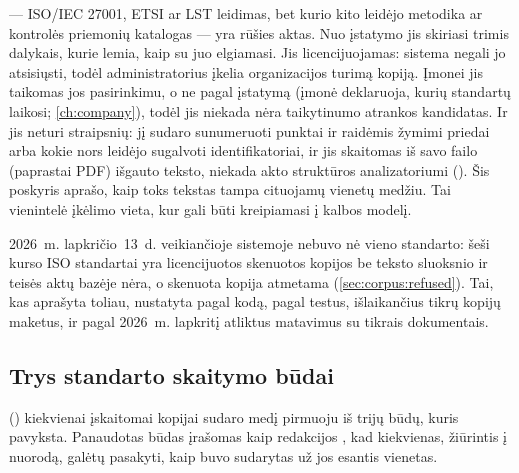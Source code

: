  --- ISO/IEC 27001, ETSI ar LST leidimas, bet kurio kito leidėjo metodika ar
kontrolės priemonių katalogas --- yra  rūšies aktas. Nuo įstatymo jis skiriasi
trimis dalykais, kurie lemia, kaip su juo elgiamasi. Jis licencijuojamas: sistema negali jo
atsisiųsti, todėl administratorius įkelia organizacijos turimą kopiją. Įmonei jis taikomas jos
pasirinkimu, o ne pagal įstatymą (įmonė deklaruoja, kurių standartų laikosi;
\cref{ch:company}), todėl jis niekada nėra taikytinumo atrankos kandidatas. Ir jis neturi
straipsnių: jį sudaro sunumeruoti punktai ir raidėmis žymimi priedai arba kokie nors leidėjo
sugalvoti identifikatoriai, ir jis skaitomas iš savo failo (paprastai PDF) išgauto teksto,
niekada akto struktūros analizatoriumi (). Šis poskyris aprašo, kaip toks
tekstas tampa cituojamų vienetų medžiu. Tai vienintelė įkėlimo vieta, kur gali būti kreipiamasi
į kalbos modelį.

2026~m. lapkričio~13~d. veikiančioje sistemoje nebuvo nė vieno standarto: šeši kurso ISO
standartai yra licencijuotos skenuotos kopijos be teksto sluoksnio ir teisės aktų bazėje
nėra, o skenuota kopija atmetama (\cref{sec:corpus:refused}). Tai, kas aprašyta toliau,
nustatyta pagal kodą, pagal testus, išlaikančius tikrų kopijų maketus, ir pagal 2026~m.
lapkritį atliktus matavimus su tikrais dokumentais.

\subsection{Trys standarto skaitymo būdai}\label{sec:corpus:ways}

 () kiekvienai įskaitomai kopijai sudaro medį
pirmuoju iš trijų būdų, kuris pavyksta. Panaudotas būdas įrašomas kaip redakcijos
, kad kiekvienas, žiūrintis į nuorodą, galėtų pasakyti, kaip buvo sudarytas už jos
esantis vienetas.

